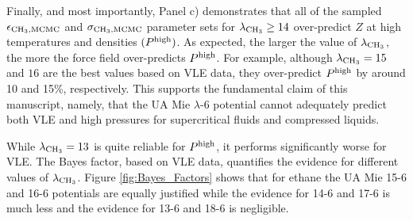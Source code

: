 \documentclass[journal=jctc,manuscript=article]{achemso}
\begin{document}



Finally, and most importantly, Panel c) demonstrates that all of the sampled $\epsilon_{\rm CH_3, MCMC}$ and $\sigma_{\rm CH_3, MCMC}$ parameter sets for $\lambda_{\rm CH_3} \ge 14$ over-predict $Z$ at high temperatures and densities $(P^{\rm high})$. As expected, the larger the value of $\lambda_{\rm CH_3}$, the 
more 
the force field over-predicts $P^{\rm high}$. For example, although $\lambda_{\rm CH_3} = 15$ and $16$ are the best values based on VLE data, they over-predict $P^{\rm high}$ by around 10 and 15\%, respectively. This supports the fundamental claim of this manuscript, namely, that the UA Mie $\lambda$-6 potential cannot adequately predict both VLE and high pressures for supercritical fluids and compressed liquids.  

While $\lambda_{\rm CH_3} = 13$ is quite reliable for $P^{\rm high}$, it performs significantly worse for VLE. The Bayes factor, based on VLE data, quantifies the evidence for different values of $\lambda_{\rm CH_3}$. Figure \ref{fig:Bayes_Factors} shows that for ethane the UA Mie 15-6 and 16-6 potentials are equally justified while the evidence for 14-6 and 17-6 is much less and the evidence for 13-6 and 18-6 is negligible. 


\end{document}
